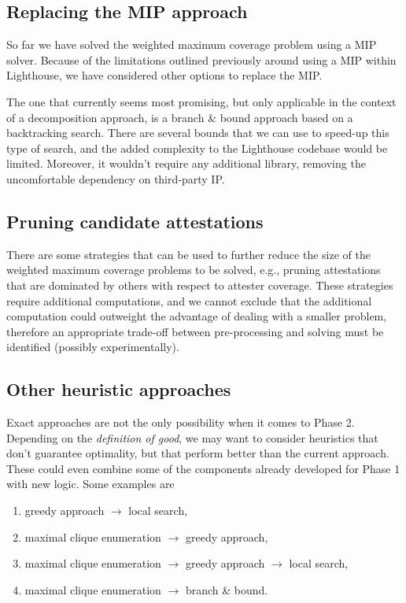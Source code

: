 \documentclass{article}
\begin{document}
\subsection{Replacing the MIP approach}

So far we have solved the weighted maximum coverage problem using a MIP
solver. Because of the limitations outlined previously around using a MIP
within Lighthouse, we have considered other options to replace the MIP. 

The one that currently seems most promising, but only applicable in the context
of a decomposition approach, is a branch \& bound approach based on a
backtracking search. There are several bounds that we can use to speed-up this
type of search, and the added complexity to the Lighthouse codebase would be
limited. Moreover, it wouldn't require any additional library, removing the
uncomfortable dependency on third-party IP. 

\subsection{Pruning candidate attestations}

There are some strategies that can be used to further reduce the size of the
weighted maximum coverage problems to be solved, e.g., pruning attestations
that are dominated by others with respect to attester coverage. These
strategies require additional computations, and we cannot exclude that the
additional computation could outweight the advantage of dealing with a smaller
problem, therefore an appropriate trade-off between pre-processing and solving
must be identified (possibly experimentally).

\subsection{Other heuristic approaches}

Exact approaches are not the only possibility when it comes to Phase 2.
Depending on the \emph{definition of good}, we may want to consider heuristics
that don't guarantee optimality, but that perform better than the current
approach. These could even combine some of the components already developed
for Phase 1 with new logic. Some examples are

\begin{enumerate}
  \item greedy approach $\rightarrow$ local search,
  \item maximal clique enumeration $\rightarrow$ greedy approach,
  \item maximal clique enumeration $\rightarrow$ greedy approach $\rightarrow$
  local search,
  \item maximal clique enumeration $\rightarrow$ branch \& bound.
\end{enumerate}
\end{document}
